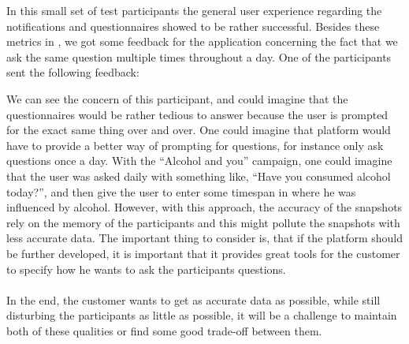 In this small set of test participants the general user experience regarding the notifications and questionnaires showed to be rather successful. Besides these metrics in , we got some feedback for the application concerning the fact that we ask the same question multiple times throughout a day. One of the participants sent the following feedback:

\begin{quote}
\end{quote}

We can see the concern of this participant, and could imagine that the questionnaires would be rather tedious to answer because the user is prompted for the exact same thing over and over. One could imagine that platform would have to provide a better way of prompting for questions, for instance only ask questions once a day. With the ``Alcohol and you'' campaign, one could imagine that the user was asked daily with something like, ``Have you consumed alcohol today?'', and then give the user to enter some timespan in where he was influenced by alcohol. However, with this approach, the accuracy of the snapshots rely on the memory of the participants and this might pollute the snapshots with less accurate data. The important thing to consider is, that if the platform should be further developed, it is important that it provides great tools for the customer to specify how he wants to ask the participants questions. 
\\\\
In the end, the customer wants to get as accurate data as possible, while still disturbing the participants as little as possible, it will be a challenge to maintain both of these qualities or find some good trade-off between them.